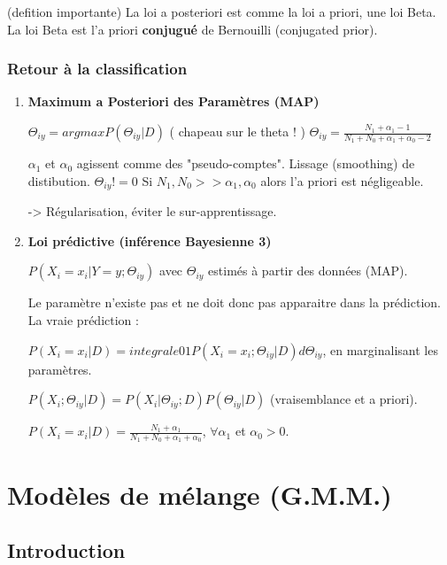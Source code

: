 \documentclass{article}
\begin{document}
(defition importante)
La loi a posteriori est comme la loi a priori, une loi Beta. La loi Beta est l'a priori \textbf{conjugué} de Bernouilli (conjugated prior).

\subsubsection{Retour à la classification}

\begin{enumerate}

\item \textbf{Maximum a Posteriori des Paramètres (MAP)}

$ \Theta_{iy} = argmax P(\Theta_{iy} | D) $ ( chapeau sur le theta ! )
$ \Theta_{iy} = \frac{N_1 + \alpha_1 - 1}{N_1 + N_0 + \alpha_1 + \alpha_0 - 2} $

$\alpha_1$ et $\alpha_0$ agissent comme des "pseudo-comptes". Lissage (smoothing) de distibution.
$\Theta_{iy} != 0$
Si $N_1, N_0 >> \alpha_1, \alpha_0$ alors l'a priori est négligeable.

-> Régularisation, éviter le sur-apprentissage.

\item \textbf{Loi prédictive (inférence Bayesienne 3)}

$P(X_i = x_i | Y = y; \Theta_{iy})$ avec $\Theta_{iy}$ estimés à partir des données (MAP).

Le paramètre n'existe pas et ne doit donc pas apparaitre dans la prédiction. La vraie prédiction :

$P(X_i = x_i | D) = integrale01 P(X_i = x_i; \Theta_{iy} | D) d \Theta_{iy}$, en marginalisant les paramètres.

$P(X_i; \Theta_{iy} | D) = P(X_i | \Theta_{iy}; D) P(\Theta_{iy} | D)$ (vraisemblance et a priori).

$ P(X_i = x_i | D) = \frac{N_1 + \alpha_1}{N_1 + N_0 + \alpha_1 + \alpha_0}$, $\forall \alpha_1$ et $\alpha_0 > 0$.

\end{enumerate}

\section{Modèles de mélange (G.M.M.)}

\subsection{Introduction}
\end{document}
